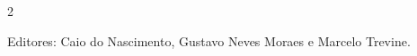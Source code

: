 \documentclass[11pt,a4paper]{article}
\begin{document}
\sloppy

\newcommand{\edicaoMes}{SETEMBRO}
\newcommand{\edicaoAno}{2026}





\begin{multicols}{2}




%




{\color{gray}
Editores:
Caio do Nascimento, Gustavo Neves Moraes e Marcelo Trevine.
}

\end{multicols}
\end{document}

